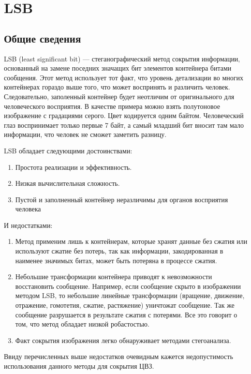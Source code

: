 \chapter{LSB}
\section{Общие сведения}
LSB (least significant bit) --- стеганографический метод сокрытия информации, основанный на замене поседних значащих бит
элементов контейнера битами сообщения. Этот метод использует тот факт,
что уровень детализации во многих контейнерах гораздо выше того,
что может воспринять и различить человек.
Следовательно, заполенный контейнер будет неотличим от оригинального
для человеческого восприятия. В качестве примера можно взять
полутоновое изображение с градациями серого. Цвет кодируется одним байтом.
Человеческий глаз воспринимает только первые 7 байт,
а самый младший бит вносит там мало информации, что человек не сможет заметить разницу.

LSB обладает следующими достоинствами:
\begin{enumerate}
    \item Простота реализации и эффективность.
    \item Низкая вычислительная сложность.
    \item Пустой и заполненный контейнер неразличимы для органов восприятия человека
\end{enumerate}
И недостатками:
\begin{enumerate}
    \item Метод применим лишь к контейнерам, которые хранят данные без сжатия или используют
    сжатие без потерь, так как информации, закодированная в наименее значимых битах, может
    быть потеряна в процессе сжатия.
    \item Небольшие трансформации контейнера приводят к невозможности восстановить сообщение.
    Например, если сообщение скрыто в изображении методом LSB, то небольшие линейные трансформации
    (вращение, движение, отражение, гомотетия, сжатие, растяжение) уничтожат сообщение. Так же
    сообщение разрушается в результате сжатия с потерями. Все это говорит о том, что метод обладает
    низкой робастостью.
    \item Факт сокрытия изображения легко обнаруживает методами стегоанализа.
\end{enumerate}

Ввиду перечисленных выше недостатков очевидным кажется недопустимость использования
данного методы для сокрытия ЦВЗ.

